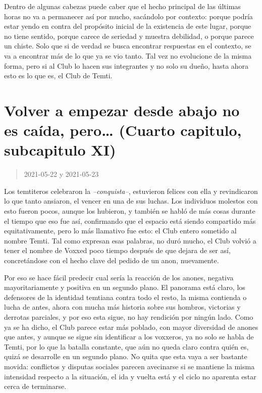 \documentclass[
  spanish,
]{book}
\begin{document}
Dentro de algunas cabezas puede caber que el hecho principal de las últimas horas no va a permanecer así por mucho, sacándolo por contexto: porque podría estar yendo en contra del propósito inicial de la existencia de este lugar, porque no tiene sentido, porque carece de seriedad y muestra debilidad, o porque parece un chiste. Solo que si de verdad se busca encontrar respuestas en el contexto, se va a encontrar más de lo que ya se vio tanto. Tal vez no evolucione de la misma forma, pero si al Club lo hacen sus integrantes y no solo su dueño, hasta ahora esto es lo que es, el Club de Temti.

\hypertarget{volver-a-empezar-desde-abajo-no-es-cauxedda-pero-cuarto-capitulo-subcapitulo-xi}{%
\section{Volver a empezar desde abajo no es caída, pero\ldots{} (Cuarto capitulo, subcapitulo XI)}\label{volver-a-empezar-desde-abajo-no-es-cauxedda-pero-cuarto-capitulo-subcapitulo-xi}}

\begin{quote}
2021-05-22 y 2021-05-23
\end{quote}

Los temtiteros celebraron la \emph{--conquista--}, estuvieron felices con ella y revindicaron lo que tanto ansiaron, el vencer en una de sus luchas. Los individuos molestos con esto fueron pocos, aunque los hubieron, y también se habló de más cosas durante el tiempo que eso fue así, confirmando que el espacio está siendo compartido más equitativamente, pero lo más llamativo fue esto: el Club entero sometido al nombre Temti. Tal como expresan esas palabras, no duró mucho, el Club volvió a tener el nombre de Voxxed poco tiempo después de que dejara de ser así, concretándose con el hecho clave del pedido de un anon, nuevamente.

Por eso se hace fácil predecir cual sería la reacción de los anones, negativa mayoritariamente y positiva en un segundo plano. El panorama está claro, los defensores de la identidad temtiana contra todo el resto, la misma contienda o lucha de antes, ahora con mucha más historia sobre sus hombros, victorias y derrotas parciales, y por eso esta sigue, no hay rendición por ningún lado.
Como ya se ha dicho, el Club parece estar más poblado, con mayor diversidad de anones que antes, y aunque se sigue sin identificar a los voxxeros, ya no solo se habla de Temti, por lo que la batalla constante, que aún no queda claro contra quién es, quizá se desarrolle en un segundo plano. No quita que esta vaya a ser bastante movida: conflictos y disputas sociales parecen avecinarse si se mantiene la misma intensidad respecto a la situación, el ida y vuelta está y el ciclo no aparenta estar cerca de terminarse.
\end{document}
